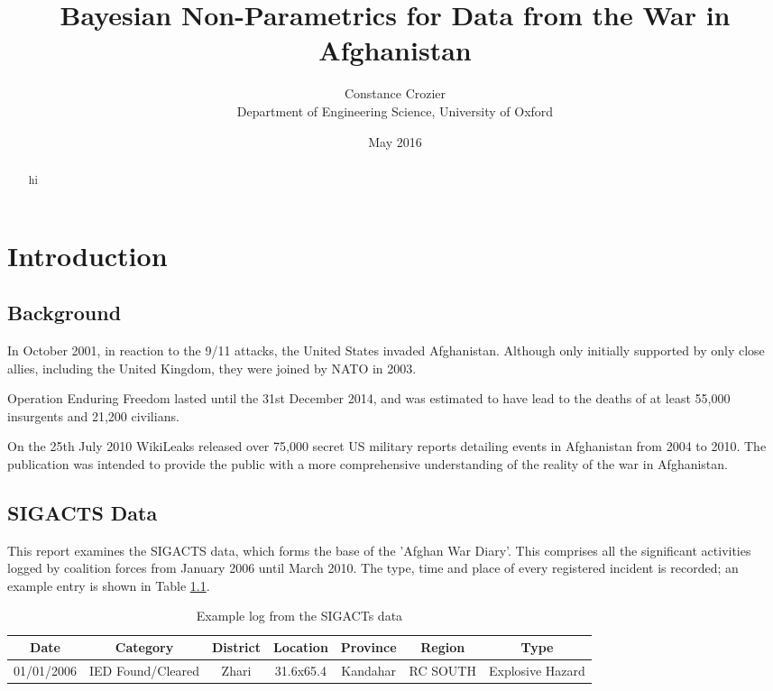 \documentclass[a4paper,11pt]{report}
\author{Constance Crozier\\Department of Engineering Science, University of Oxford}
\title{Bayesian Non-Parametrics for Data from the War in Afghanistan}
\date{May 2016}
\begin{document}
\maketitle

\begin{abstract}
hi
\end{abstract}

\singlespacing
\pagestyle{plain}
\tableofcontents
\doublespacing

\pagebreak

\chapter{Introduction}
\section{Background}

In October 2001, in reaction to the 9/11 attacks, the United States invaded Afghanistan. Although only initially supported by only close allies, including the United Kingdom, they were joined by NATO in 2003. \par

Operation Enduring Freedom lasted until the 31st December 2014, and was estimated to have lead to the deaths of at least 55,000 insurgents and 21,200 civilians.\cite{bodycount}

On the 25th July 2010 WikiLeaks released over 75,000 secret US military reports detailing events in Afghanistan from 2004 to 2010. \cite{wikileaks} The publication was intended to provide the public with a more comprehensive understanding of the reality of the war in Afghanistan.

\section{SIGACTS Data}
This report examines the SIGACTS data, which forms the base of the 'Afghan War Diary'. This comprises all the significant activities logged by coalition forces from January 2006 until March 2010. The type, time and place of every registered incident is recorded; an example entry is shown in Table \ref{tab:sigactseg}. 

\begin{table}[]
\centering
\caption{Example log from the SIGACTs data}
\label{tab:sigactseg}
\begin{tabular}{|c|c|c|c|c|c|c|}
\hline
\bf{Date} & \bf{Category} & \bf{District} & \bf{Location} &  \bf{Province} & \bf{Region} & \bf{Type} \\ \hline
01/01/2006 & IED Found/Cleared & Zhari & 31.6x65.4 & Kandahar & RC SOUTH & Explosive Hazard \\ \hline
\end{tabular}
\end{table}
\end{document}
